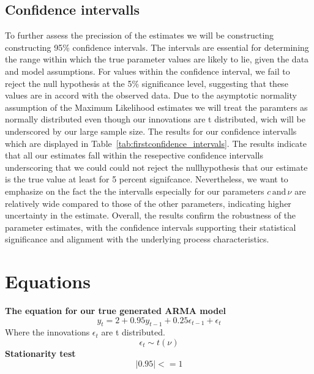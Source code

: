 \documentclass[12pt]{article}
\begin{document}
\subsection{Confidence intervalls}
To further assess the precission of the estimates we will be constructing constructing 95\% confidence intervals.
The intervals are essential for determining the range within which the true parameter values are likely to lie, given the data and model assumptions.
For values within the confidence interval, we fail to reject the null hypothesis at the 5\% significance level, suggesting that these values are in accord with the observed data. 
Due to the asymptotic normality assumption of the Maximum Likelihood estimates we will treat the paramters as normally distributed even though our innovations are t distributed, wich will be underscored by our large sample size. 
The results for our confidence intervalls which are displayed in Table~\ref{tab:firstconfidence_intervals}.
The results indicate that all our estimates fall within the resepective confidence intervalls underscoring that we could could not reject the nullhypothesis that our estimate is the true value at least for 5 percent signifcance.
Nevertheless, we want to emphasize on the fact the the intervalls especially for our parameters $c \, \text{and} \, \nu$ are relatively wide compared to those of the other parameters, indicating higher uncertainty in the estimate.
Overall, the results confirm the robustness of the parameter estimates, with the confidence intervals supporting their statistical significance and alignment with the underlying process characteristics. 









\newpage
\section{Equations}
\textbf{The equation for our true generated ARMA model}
\begin{equation}
    y_t = 2 + 0.95y_{t-1} + 0.25\epsilon_{t-1} + \epsilon_t
\label{eq:arma}
\end{equation}
Where the innovations $\epsilon_t$ are t distributed.
 \begin{equation}
     \epsilon_t \sim t(\nu) 
 \end{equation}
\textbf{Stationarity test}
\begin{equation}
    |0.95| <= 1
    \label{eq:stat}
\end{equation}
\end{document}
